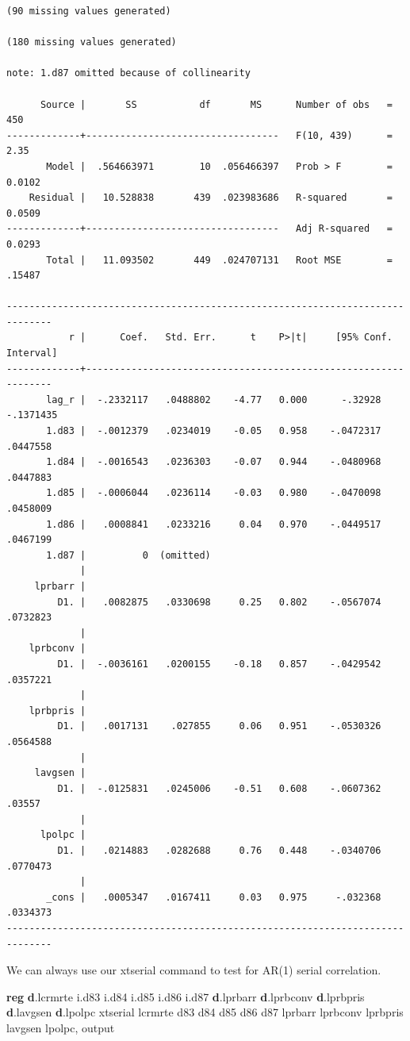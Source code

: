 \documentclass[
]{book}
\newenvironment{Shaded}{\begin{snugshade}}{\end{snugshade}}
\newcommand{\KeywordTok}[1]{\textcolor[rgb]{0.13,0.29,0.53}{\textbf{#1}}}
\newcommand{\NormalTok}[1]{#1}
\begin{document}
\begin{verbatim}
(90 missing values generated)

(180 missing values generated)

note: 1.d87 omitted because of collinearity

      Source |       SS           df       MS      Number of obs   =       450
-------------+----------------------------------   F(10, 439)      =      2.35
       Model |  .564663971        10  .056466397   Prob > F        =    0.0102
    Residual |   10.528838       439  .023983686   R-squared       =    0.0509
-------------+----------------------------------   Adj R-squared   =    0.0293
       Total |   11.093502       449  .024707131   Root MSE        =    .15487

------------------------------------------------------------------------------
           r |      Coef.   Std. Err.      t    P>|t|     [95% Conf. Interval]
-------------+----------------------------------------------------------------
       lag_r |  -.2332117   .0488802    -4.77   0.000      -.32928   -.1371435
       1.d83 |  -.0012379   .0234019    -0.05   0.958    -.0472317    .0447558
       1.d84 |  -.0016543   .0236303    -0.07   0.944    -.0480968    .0447883
       1.d85 |  -.0006044   .0236114    -0.03   0.980    -.0470098    .0458009
       1.d86 |   .0008841   .0233216     0.04   0.970    -.0449517    .0467199
       1.d87 |          0  (omitted)
             |
     lprbarr |
         D1. |   .0082875   .0330698     0.25   0.802    -.0567074    .0732823
             |
    lprbconv |
         D1. |  -.0036161   .0200155    -0.18   0.857    -.0429542    .0357221
             |
    lprbpris |
         D1. |   .0017131    .027855     0.06   0.951    -.0530326    .0564588
             |
     lavgsen |
         D1. |  -.0125831   .0245006    -0.51   0.608    -.0607362      .03557
             |
      lpolpc |
         D1. |   .0214883   .0282688     0.76   0.448    -.0340706    .0770473
             |
       _cons |   .0005347   .0167411     0.03   0.975     -.032368    .0334373
------------------------------------------------------------------------------
\end{verbatim}

We can always use our xtserial command to test for AR(1) serial correlation.

\begin{Shaded}
\begin{Highlighting}[]
\KeywordTok{reg} \KeywordTok{d}\NormalTok{.lcrmrte i.d83 i.d84 i.d85 i.d86 i.d87 }\KeywordTok{d}\NormalTok{.lprbarr }\KeywordTok{d}\NormalTok{.lprbconv }\KeywordTok{d}\NormalTok{.lprbpris }\KeywordTok{d}\NormalTok{.lavgsen }\KeywordTok{d}\NormalTok{.lpolpc}
\NormalTok{xtserial lcrmrte d83 d84 d85 d86 d87 lprbarr lprbconv lprbpris lavgsen lpolpc, output}
\end{Highlighting}
\end{Shaded}
\end{document}
